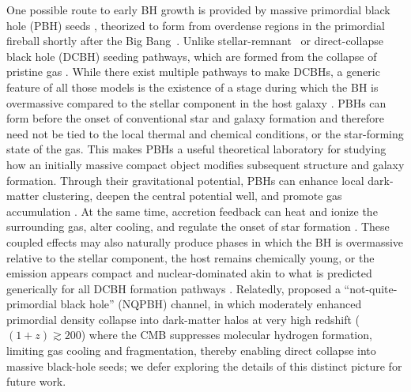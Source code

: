 \documentclass[twocolumn,trackchanges]{aastex701}
\begin{document}
One possible route to early BH growth is provided by massive primordial black hole (PBH) seeds \citep[e.g.,][]{Cappelluti2022ApJ, Huang:2024aog, DeLuca2026PhRvL,  KashlinskyPBH2026MNRAS, Huang2026PhRvD.113b3519H}, theorized to form from overdense regions in the primordial fireball shortly after the Big Bang~\citep[for reviewing work, see e.g.,][]{Carr2020ARNPS..70..355C, EscrivaPBH2024}. Unlike stellar-remnant~\citep[e.g.,][]{Alexander2014Sci...345.1330A} or direct-collapse black hole (DCBH) seeding pathways, which are formed from the collapse of pristine gas \citep[e.g.,][]{BrommDCBH2003ApJ...596...34B, Begelman2006:DCBH, Lodato:2006DCBH}. While there exist multiple pathways to make DCBHs, a generic feature of all those models is the existence of a stage during which the BH is overmassive compared to the stellar component in the host galaxy \cite{Agarwal+2013, Natarajan+2017}.
PBHs can form before the onset of conventional star and galaxy formation and therefore need not be tied to the local thermal and chemical conditions, or the star-forming state of the gas. This makes PBHs a useful theoretical laboratory for studying how an initially massive compact object modifies subsequent structure and galaxy formation. Through their gravitational potential, PBHs can enhance local dark-matter clustering, deepen the central potential well, and promote gas accumulation \citep{Afshordi2003ApJ...594L..71A,Mack2007ApJ, Ricotti2007ApJI, Ricotti2008ApJII,ZhangPBH2024ApJ,Liu2025}. At the same time, accretion feedback can heat and ionize the surrounding gas, alter cooling, and regulate the onset of star formation \citep{LiuPBH2022MNRAS, Ziparo2022, Casanueva2024, ZhangPBH2024MNRAS,ZhangPBHGalaxy2025ApJ}. These coupled effects may also naturally produce phases in which the BH is overmassive relative to the stellar component, the host remains chemically young, or the emission appears compact and nuclear-dominated akin to what is predicted generically for all DCBH formation pathways \citep[e.g.,]{Dayal2024A&A...690A.182D,Dayal2026arXiv260420966D,DayalPBH2026A&A,Zhang2026PBHApJL}. Relatedly, \citet{Qin+2025} proposed a ``not-quite-primordial black hole'' (NQPBH) channel, in which moderately enhanced primordial density collapse into dark-matter halos at very high redshift ($(1+z) \gtrsim 200$) where the CMB suppresses molecular hydrogen formation, limiting gas cooling and fragmentation, thereby enabling direct collapse into massive black-hole seeds; we defer exploring the details of this distinct picture for future work.
\end{document}
